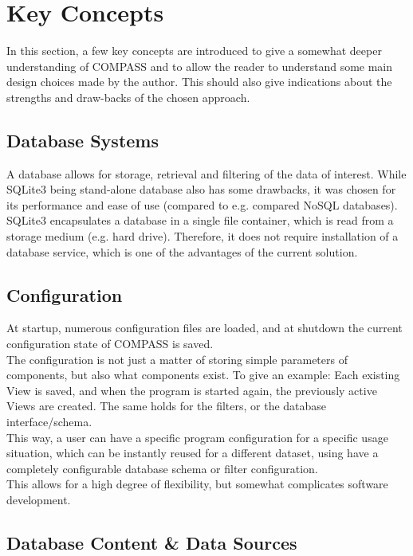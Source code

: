 \section{Key Concepts}
\label{sec:key_concepts}

In this section, a few key concepts are introduced to give a somewhat deeper understanding of COMPASS and to allow the reader to understand some main design choices made by the author. This should also give indications about the strengths and draw-backs of the chosen approach.

\subsection*{Database Systems}
A database allows for storage, retrieval and filtering of the data of interest. While SQLite3 being stand-alone database also has some drawbacks, it was chosen for its performance and ease of use (compared to e.g. compared NoSQL databases).\\
SQLite3 encapsulates a database in a single file container, which is read from a storage medium (e.g. hard drive). Therefore, it does not require installation of a database service, which is one of the advantages of the current solution.

\subsection*{Configuration}
At startup, numerous configuration files are loaded, and at shutdown the current configuration state of COMPASS is saved.\\
The configuration is not just a matter of storing simple parameters of components, but also what components exist. To give an example: Each existing View is saved, and when the program is started again, the previously active Views are created.  The same holds for the filters, or the database interface/schema. \\
This way, a user can have a specific program configuration for a specific usage situation, which can be instantly reused for a different dataset, using have a completely configurable database schema or filter configuration. \\
This allows for a high degree of flexibility, but somewhat complicates software development.

\subsection*{Database Content \& Data Sources}

